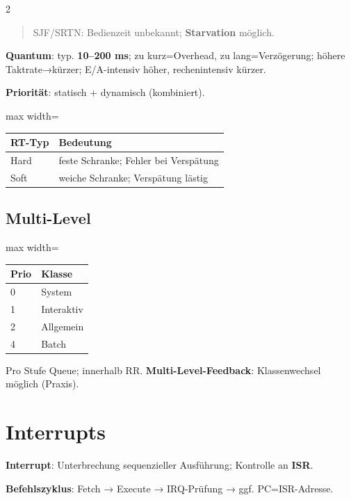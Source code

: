 \documentclass[10pt, a4paper]{article}
\begin{document}
\begin{multicols}{2}
\begin{quote}
SJF/SRTN: Bedienzeit unbekannt; \textbf{Starvation} möglich.
\end{quote}

\textbf{Quantum}: typ. \textbf{10–200 ms}; zu kurz=Overhead, zu lang=Verzögerung; höhere Taktrate→kürzer; E/A-intensiv höher, rechenintensiv kürzer.


\textbf{Priorität}: statisch + dynamisch (kombiniert).



{\small
\begin{adjustbox}{max width=\linewidth}
{\scriptsize
\begin{tabular}{ll}
\toprule
\textbf{RT-Typ} & \textbf{Bedeutung} \\
\midrule
Hard & feste Schranke; Fehler bei Verspätung \\
Soft & weiche Schranke; Verspätung lästig \\
\bottomrule
\end{tabular}
}
\end{adjustbox}
}



\subsection{Multi-Level}


{\small
\begin{adjustbox}{max width=\linewidth}
{\scriptsize
\begin{tabular}{ll}
\toprule
\textbf{Prio} & \textbf{Klasse} \\
\midrule
0 & System \\
1 & Interaktiv \\
2 & Allgemein \\
4 & Batch \\
\bottomrule
\end{tabular}
}
\end{adjustbox}
}


Pro Stufe Queue; innerhalb RR. \textbf{Multi-Level-Feedback}: Klassenwechsel möglich (Praxis).



\section{Interrupts}

\textbf{Interrupt}: Unterbrechung sequenzieller Ausführung; Kontrolle an \textbf{ISR}.


\textbf{Befehlszyklus}: Fetch → Execute → IRQ-Prüfung → ggf. PC=ISR-Adresse.




\end{multicols}
\end{document}
